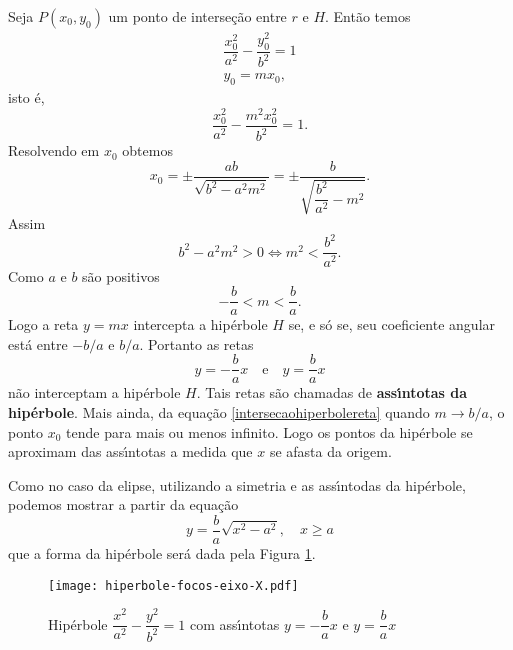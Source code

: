Seja $P(x_0,y_0)$ um ponto de interse\c{c}\~ao entre $r$ e $H$. Ent\~ao temos
\begin{align*}
  \dfrac{x_0^2}{a^2} - \dfrac{y_0^2}{b^2} = 1\\
  y_0 = mx_0,
\end{align*}
isto \'e,
\[
  \dfrac{x_0^2}{a^2} - \dfrac{m^2x_0^2}{b^2} = 1.
\]
Resolvendo em $x_0$ obtemos
\begin{equation}\label{intersecaohiperbolereta}
x_0 = \pm \dfrac{ab}{\sqrt{b^2 - a^2m^2}} = \pm \dfrac{b}{\sqrt{\dfrac{b^2}{a^2} - m^2}}.
\end{equation}
Assim
\[
  b^2 - a^2m^2 > 0 \Leftrightarrow m^2 < \dfrac{b^2}{a^2}.
\]
Como $a$ e $b$ s\~ao positivos
\[
  -\dfrac{b}{a} < m < \dfrac{b}{a}.
\]
Logo a reta $y = mx$ intercepta a hip\'erbole $H$ se, e s\'o se, seu coeficiente angular est\'a entre $-b/a$ e $b/a$. Portanto as retas
\[
  y = -\dfrac{b}{a}x \quad \mbox{e}\quad y = \dfrac{b}{a}x
\]
n\~ao interceptam a hip\'erbole $H$. Tais retas s\~ao chamadas de \textbf{ass{\'\i}ntotas da hip\'erbole}. Mais ainda, da equa\c{c}\~ao \eqref{intersecaohiperbolereta} quando $m \to b/a$, o ponto $x_0$ tende para mais ou menos infinito. Logo os pontos da hip\'erbole se aproximam das ass{\'\i}ntotas a medida que $x$ se afasta da origem.

Como no caso da elipse, utilizando a simetria e as ass{\'\i}ntodas da hip\'erbole, podemos mostrar a partir da equa\c{c}\~ao
\[
  y = \dfrac{b}{a}\sqrt{x^2 - a^2}, \quad x \ge a
\]
que a forma da hip\'erbole ser\'a dada pela Figura \ref{FormageralHiperbole}.
\begin{figure}[!h]
  \centering
  \caption{Hip\'erbole $\dfrac{x^2}{a^2} - \dfrac{y^2}{b^2} = 1$  com ass{\'\i}ntotas $y = -\dfrac{b}{a}x$ e $y = \dfrac{b}{a}x$}
  \label{FormageralHiperbole}
  \texttt{[image: hiperbole-focos-eixo-X.pdf]}
\end{figure}

